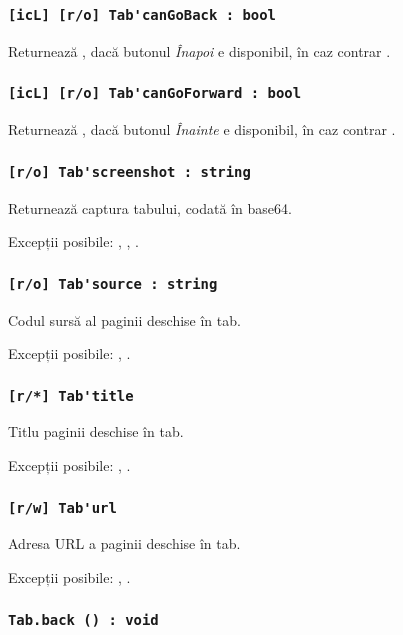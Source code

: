 \subsubsection{\lstinline|[icL] [r/o] Tab'canGoBack : bool|}

Returnează \true, dacă butonul \textit{Înapoi} e disponibil, în caz contrar \false.

\subsubsection{\lstinline|[icL] [r/o] Tab'canGoForward : bool|}

Returnează \true, dacă butonul \textit{Înainte} e disponibil, în caz contrar \false.

\subsubsection{\lstinline|[r/o] Tab'screenshot : string|}

Returnează captura tabului, codată în base64.

Excepții posibile: , , .

\subsubsection{\lstinline|[r/o] Tab'source : string|}

Codul sursă al paginii deschise în tab.

Excepții posibile: , .

\subsubsection{\lstinline|[r/*] Tab'title|}

Titlu paginii deschise în tab.

Excepții posibile: , .

\subsubsection{\lstinline|[r/w] Tab'url|}

Adresa URL a paginii deschise în tab.

Excepții posibile: , .

\subsubsection{\lstinline|Tab.back () : void|}

